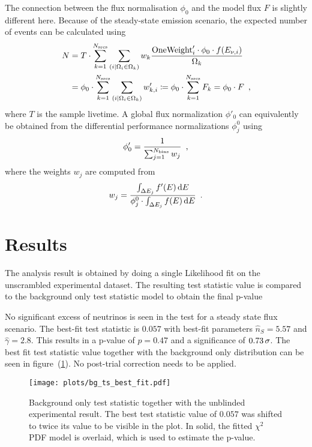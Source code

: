 The connection between the flux normalisation $\phi_0$ and the model flux $F$ is slightly different here.
Because of the steady-state emission scenario, the expected number of events can be calculated using
\begin{align}
  N
  &= T\cdot\sum_{k=1}^{N_\text{srcs}} \sum_{(i|\Omega_i \in \Omega_k)}
      w_k\frac{\text{OneWeight}'_i\cdot\phi_0\cdot f(E_{\nu,i})}{\Omega_k} \\
  &= \phi_0 \cdot
      \sum_{k=1}^{N_\text{srcs}}
      \sum_{(i|\Omega_i \in \Omega_k)} w'_{k,i}
  \coloneqq \phi_0 \cdot \sum_{k=1}^{N_\text{srcs}} F_k = \phi_0 \cdot F
  \enspace\text{,}
\end{align}
where $T$ is the sample livetime.
A global flux normalization $\phi'_0$ can equivalently be obtained from the differential performance normalizations $\phi_j^0$ using
\begin{equation}
  \phi'_0 = \frac{1}{\sum_{j=1}^{N_\text{bins}} w_j}
  \enspace\text{,}
\end{equation}
where the weights $w_j$ are computed from
\begin{equation}
  w_j = \frac{\int_{\Delta E_j} f'(E)\,\text{d}E}
             {\phi_j^0\cdot\int_{\Delta E_j} f(E)\,\text{d}E}
  \enspace\text{.}
\end{equation}


\section{Results}
The analysis result is obtained by doing a single Likelihood fit on the unscrambled experimental dataset.
The resulting test statistic value is compared to the background only test statistic model to obtain the final p-value

No significant excess of neutrinos is seen in the test for a steady state flux scenario.
The best-fit test statistic is $\num{0.057}$ with best-fit parameters $\hat{n}_S = \num{5.57}$ and $\hat{\gamma} = \num{2.8}$.
This results in a p-value of $p=0.47$ and a significance of $\num{0.73}\,\sigma$.
The  best fit test statistic value together with the background only distribution can be seen in figure~(\ref{fig:tindep_bg_ts_best_fit}).
No post-trial correction needs to be applied.

\begin{figure}[htbp]
  \centering
  \texttt{[image: plots/bg\_ts\_best\_fit.pdf]}
  \caption[Experimental result of the time-integrated analysis]{
    Background only test statistic together with the unblinded experimental result.
    The best test statistic value of $\num{0.057}$ was shifted to twice its value to be visible in the plot.
    In solid, the fitted $\chi^2$ PDF model is overlaid, which is used to estimate the p-value.
  }
  \label{fig:tindep_bg_ts_best_fit}
\end{figure}
